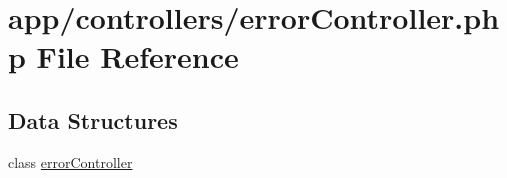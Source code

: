 \hypertarget{error_controller_8php}{}\section{app/controllers/error\+Controller.php File Reference}
\label{error_controller_8php}
\subsection*{Data Structures}
\begin{DoxyCompactItemize}
\item 
class \hyperlink{classerror_controller}{error\+Controller}
\end{DoxyCompactItemize}
